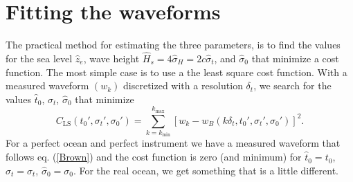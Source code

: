



\section{Fitting the waveforms}

The practical method for estimating the three parameters, is to find the values for the sea level $\widehat{z}_e$, wave height $\widehat{H}_s=4 \widehat{\sigma}_H= 2 c \widehat{\sigma}_t$, and $\widehat{\sigma}_0$ that minimize a cost function. The most simple case is to use a the least square cost 
function. With a measured waveform $(w_k)$ discretized with a resolution $\delta_t$, we search for the values  $\widehat{t}_0$, $\widehat{\sigma}_t$, $\widehat{\sigma}_0$ that minimize 
\begin{equation} 
    C_{\mathrm{LS}}(t_0',\sigma_t',\sigma_0')=\sum_{k=k_{\min}}^{k_{\max}}  \left[ w_k - w_B(k \delta_t,t_0',\sigma_t',\sigma_0') \right]^2. \label{eq_CLS}
\end{equation}
For a perfect ocean and perfect instrument we have a measured waveform that follows eq. (\ref{Brown}) and the cost function is zero (and minimum) for 
$\widehat{t}_0=t_0$, $\widehat{\sigma}_t=\sigma_t$, $\widehat{\sigma}_0=\sigma_0$. For the real ocean, we get something that is a little different. 

